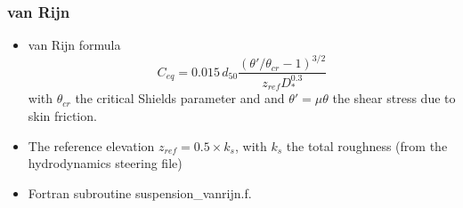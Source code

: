 \subsubsection{van Rijn}
\begin{itemize}
\item van Rijn formula~\cite{vanRijn84b} 
\begin{equation*}
C_{eq} =0.015\,d_{50}\frac{\left(\theta'/\theta_{cr}-1\right)^{3/2}}{z_{ref}D_*^{0.3}}
\end{equation*}
with $\theta_{cr}$ the critical Shields parameter and and $\theta'= \mu\theta$ the shear stress due to skin friction.
\item The reference elevation $z_{ref}=0.5 \times k_s$, with $k_s$ the total roughness (from the hydrodynamics steering file)
\item Fortran subroutine {\ttfamily suspension\_vanrijn.f}.
\end{itemize}

